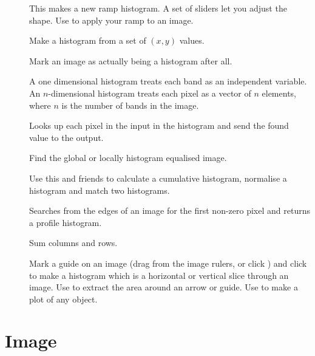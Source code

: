 \begin{description}

\item[]
	This makes a new ramp histogram. A set of sliders let you adjust the
	shape. Use  to apply your ramp to an image.

\item[]
	Make a histogram from a set of $(x, y)$ values. 

\item[]
	Mark an image as actually being a histogram after all.

\item[]
	A one dimensional histogram treats each band as an independent
	variable. An $n$-dimensional histogram treats each pixel as a vector of
	$n$ elements, where $n$ is the number of bands in the image.

\item[]
	Looks up each pixel in the input in the histogram and send the found
	value to the output.

\item[]
	Find the global or locally histogram equalised image.

\item[]
	Use this and friends to calculate a cumulative histogram, normalise a
	histogram and match two histograms.

\item[]
	Searches from the edges of an image for the first non-zero pixel and
	returns a profile histogram. 

\item[]
	Sum columns and rows.

\item[]
	Mark a guide on an image (drag from the
	image rulers, or click ) and click 
	 to make a histogram which is a horizontal or vertical 
	slice through an image. Use  to extract the area
	around an arrow or guide. Use  to make a plot of any
	object.

\end{description}

\section{Image}

